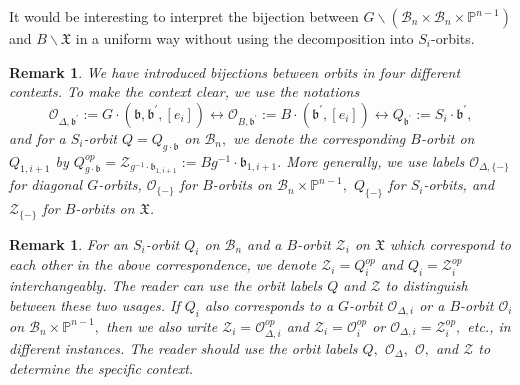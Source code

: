 \documentclass[12pt]{amsart}
\numberwithin{equation}{section}
\newtheorem{rem}[thm]{Remark}
\newcommand{\cZ}{{\mathcal Z}}
\newcommand{\fb}{\mbox{${\mathfrak b}$}}
\newcommand{\B}{\mathcal{B}}
\begin{document}
 It would be interesting to interpret the bijection between $G\backslash(\B_{n}\times\B_{n}\times\mathbb{P}^{n-1})$ and $  B\backslash \mathfrak{X}$ in a uniform way without using the decomposition into $S_i$-orbits.

\begin{rem}\label{rem:orbitlabels}
We have introduced bijections between orbits in four different contexts.  To make the context clear, we use the notations
\begin{equation} \label{eq:three}  
\mathcal{O}_{\Delta,\fb^{\prime}}:=G\cdot (\fb, \fb^{\prime}, [e_{i}])\longleftrightarrow \mathcal{O}_{B,\fb^{\prime}}:=B\cdot (\fb^{\prime}, [e_{i}])\longleftrightarrow Q_{\fb^{\prime}}:=S_{i}\cdot \fb^{\prime},
\end{equation}
and for a $S_i$-orbit $Q=Q_{g\cdot \fb}$ on $\B_n,$ we denote the corresponding $B$-orbit on $Q_{1,i+1}$ by $Q_{g\cdot \fb}^{op}={\cZ}_{g^{-1}\cdot \fb_{1,i+1}}:=Bg^{-1}\cdot \fb_{1,i+1}.$  More generally, we use labels $\mathcal{O}_{\Delta, \{-\}}$ for diagonal $G$-orbits, $\mathcal{O}_{\{-\}}$ for $B$-orbits on $\B_n \times \mathbb{P}^{n-1},$ $Q_{\{-\}}$ for $S_i$-orbits, and ${\cZ}_{\{-\}}$ for $B$-orbits on $\mathfrak{X}$.
\end{rem}

\begin{rem}\label{rem:oppusage}
For an $S_i$-orbit $Q_i$ on $\B_{n}$ and a $B$-orbit ${\cZ}_{i}$ on ${\mathfrak{X}}$ which correspond to each other in the above correspondence, we denote ${\cZ}_{i}=Q_{i}^{op}$ and $Q_{i}={\cZ}_{i}^{op}$ interchangeably.  The reader can use the orbit labels $Q$ and $\cZ$ to distinguish between these two usages.  If $Q_{i}$ also corresponds to a $G$-orbit $\mathcal{O}_{\Delta,i}$ or a $B$-orbit $\mathcal{O}_{i}$ on $\B_n \times \mathbb{P}^{n-1},$ then we also write ${\cZ}_{i}=\mathcal{O}_{\Delta, i}^{op}$ and ${\cZ}_{i}=\mathcal{O}_{i}^{op}$ or $\mathcal{O}_{\Delta, i} ={\cZ}_{i}^{op},$ etc.,  in different instances.    The reader should use the orbit labels $Q,$ $\mathcal{O}_{\Delta},$ $\mathcal{O},$ and $\cZ$ to determine the specific context.
\end{rem}


\end{document}
